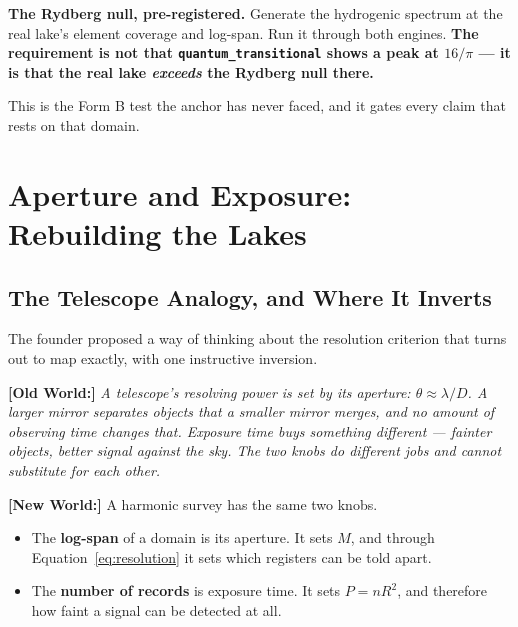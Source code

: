 \documentclass[11pt, letterpaper, openany]{book}
\newcommand{\oldworld}[1]{\noindent\textbf{\color{goldseal}[Old World:]} \textit{#1}\medskip}
\newcommand{\newworld}[1]{\noindent\textbf{\color{kishblue}[New World:]} #1\medskip}
\begin{document}
\begin{predictionbox}
\textbf{The Rydberg null, pre-registered.} Generate the hydrogenic spectrum at the real lake's
element coverage and log-span. Run it through both engines. \textbf{The requirement is not that
\texttt{quantum\_transitional} shows a peak at $16/\pi$ --- it is that the real lake
\emph{exceeds} the Rydberg null there.}

\medskip
\noindent This is the Form B test the anchor has never faced, and it gates every claim that
rests on that domain.
\end{predictionbox}

\chapter{Aperture and Exposure: Rebuilding the Lakes}

\section{The Telescope Analogy, and Where It Inverts}

The founder proposed a way of thinking about the resolution criterion that turns out to map
exactly, with one instructive inversion.

\oldworld{A telescope's resolving power is set by its \emph{aperture}: $\theta \approx
\lambda/D$. A larger mirror separates objects that a smaller mirror merges, and no amount of
observing time changes that. Exposure time buys something different --- fainter objects, better
signal against the sky. The two knobs do different jobs and cannot substitute for each other.}

\newworld{A harmonic survey has the same two knobs.

\begin{itemize}
    \item The \textbf{log-span} of a domain is its aperture. It sets $M$, and through
          Equation~\ref{eq:resolution} it sets which registers can be told apart.
    \item The \textbf{number of records} is exposure time. It sets $P = nR^2$, and therefore how
          faint a signal can be detected at all.
\end{itemize}
}
\end{document}
